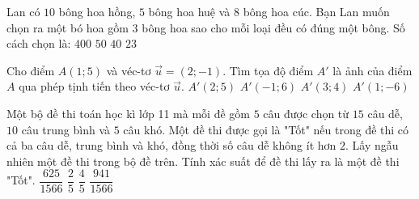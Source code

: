 \begin{ex}%
Lan có $10$ bông hoa hồng, $5$ bông hoa huệ và $8$ bông hoa cúc. Bạn Lan muốn chọn ra một bó hoa gồm $3$ bông hoa sao cho mỗi loại đều có đúng một bông. Số cách chọn là:
\choice
{\True $400$}
{$50$}
{$40$}
{$23$}
\end{ex}
\begin{ex}%
Cho điểm $A(1;5)$ và véc-tơ $\overrightarrow{u}=(2;-1)$. Tìm tọa độ điểm $A'$ là ảnh của điểm $A$ qua phép tịnh tiến theo véc-tơ $\overrightarrow{u}$.
\choice
{$A'(2;5)$}
{$A'(-1;6)$}
{\True $A'(3;4)$}
{$A'(1;-6)$}
\end{ex}
\begin{ex}%
Một bộ đề thi toán học kì lớp 11 mà mỗi đề gồm $5$ câu được chọn từ $15$ câu dễ, $10$ câu trung bình và $5$ câu khó. Một đề thi được gọi là "Tốt" nếu trong đề thi có cả ba câu dễ, trung bình và khó, đồng thời số câu dễ không ít hơn $2$. Lấy ngẫu nhiên một đề thi trong bộ đề trên. Tính xác suất để đề thi lấy ra là một đề thi "Tốt".
\choice
{\True $\dfrac{625}{1566}$}
{$\dfrac{2}{5}$}
{$\dfrac{4}{5}$}
{$\dfrac{941}{1566}$}
\end{ex}
